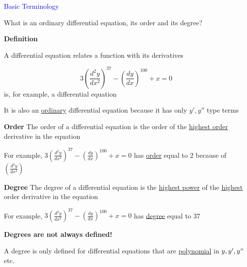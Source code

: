\documentclass[14pt,fleqn]{extarticle}
\begin{document}
\begin{skill}
\textcolor{blue}{Basic Terminology} 

What is an ordinary differential
equation, its order and its degree?
\end{skill}

%

\newcard

\textbf{Definition}

A differential equation relates a
function with its derivatives

\[ 3\left(\frac{d^2y }{dx^2}\right)^{37} - \left(\frac{dy}{dx}\right)^{100} + x = 0\] 
is, for example, a differential equation \newline 

It is also an \underline{ordinary} differential
equation because it has only $y', y''$
type terms \newline 

\textbf{Order} 
The order of a differential equation is 
the order of the \underline{highest order} derivative
in the equation

For example, $3\left(\frac{d^2y }{dx^2}\right)^{37} - \left(\frac{dy}{dx}\right)^{100} + x = 0$ has \underline{order} equal to 2 because of $\left(\frac{d^2y}{dx^2}\right)$\newline 


\textbf{Degree}
The degree of a differential equation is
the \underline{highest power} of the \underline{highest} order
derivative in the equation\newline 

For example, $3\left(\frac{d^2y }{dx^2}\right)^{37} - \left(\frac{dy}{dx}\right)^{100} + x = 0$  has \underline{degree} equal to 37 \newline 

\textbf{Degrees are not always defined!}

A degree is only defined for differential 
equations that are \underline{polynomial}
in $y,y',y"$ etc.
%
\end{document}
